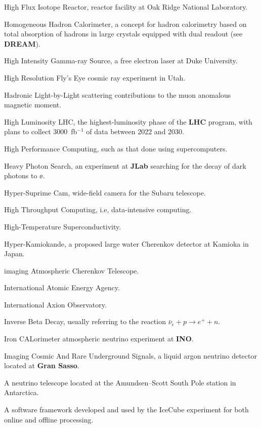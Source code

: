  High Flux Isotope Reactor, reactor facility at Oak Ridge
National Laboratory.

 Homogeneous Hadron Calorimeter, a concept for hadron
calorimetry based on total absorption of hadrons in large crystals
equipped with dual readout (see {\bf DREAM}). 

 High Intensity Gamma-ray Source, a free electron
laser at Duke University.

  High Resolution Fly's Eye cosmic ray experiment in Utah.

  Hadronic Light-by-Light scattering contributions to
the
 muon anomalous magnetic moment.

 High Luminosity LHC, the highest-luminosity phase
of the {\bf LHC}
program, with plans to collect 3000~fb$^{-1}$ of data between 2022 and
2030. 

 High Performance Computing, such as that  done using
supercomputers.

  Heavy Photon Search, an experiment at {\bf JLab}
searching for the decay of dark photons to $\ee$.

  Hyper-Suprime Cam, wide-field camera for the Subaru telescope.

  High Throughput Computing, i.e, data-intensive
computing.

 High-Temperature Superconductivity.

 Hyper-Kamiokande, a proposed large water Cherenkov
detector at Kamioka in Japan. 

  imaging Atmospheric Cherenkov Telescope.

 International Atomic Energy Agency.

  International Axion Observatory.

 Inverse Beta Decay, usually referring to the reaction
$\bar{\nu}_e+p \rightarrow e^+ + n$.


 Iron CALorimeter atmospheric neutrino experiment at {\bf INO}.

 Imaging Cosmic And Rare Underground Signals, a
liquid argon neutrino detector located at {\bf Gran Sasso}. 

 A neutrino telescope located at the
Amundsen--Scott South Pole station in Antarctica.

  A software framework developed and used by the IceCube 
  experiment for both online and offline processing. 

